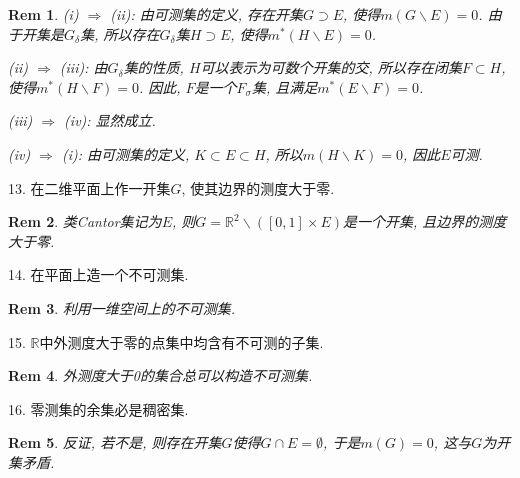 \documentclass[UTF8]{article}
\newtheorem*{remark}{Rem}
\begin{document}
    \begin{remark}
        (i) $\Rightarrow$ (ii): 由可测集的定义, 存在开集$G\supset E$, 使得$m(G\backslash E)=0$. 由于开集是$G_{\delta}$集, 所以存在$G_{\delta}$集$H\supset E$, 使得$m^{*}(H\backslash E)=0$.\par
        (ii) $\Rightarrow$ (iii): 由$G_{\delta}$集的性质, $H$可以表示为可数个开集的交, 所以存在闭集$F\subset H$, 使得$m^{*}(H\backslash F)=0$. 因此, $F$是一个$F_{\sigma}$集, 且满足$m^{*}(E\backslash F)=0$.\par
        (iii) $\Rightarrow$ (iv): 显然成立.\par
        (iv) $\Rightarrow$ (i): 由可测集的定义, $K\subset E\subset H$, 所以$m(H\backslash K)=0$, 因此$E$可测.\par
    \end{remark}
    13. 在二维平面上作一开集$G$, 使其边界的测度大于零.\par
    \begin{remark}
        类Cantor集记为$E$, 则$G=\mathbb{R}^2\backslash \left([0,1]\times E\right)$是一个开集, 且边界的测度大于零.\par
    \end{remark}
    14. 在平面上造一个不可测集.\par
    \begin{remark}
        利用一维空间上的不可测集.\par
    \end{remark}
    15. $\mathbb{R}$中外测度大于零的点集中均含有不可测的子集.\par
    \begin{remark}
        外测度大于0的集合总可以构造不可测集.\par
    \end{remark}
    16. 零测集的余集必是稠密集.\par
    \begin{remark}
        反证, 若不是, 则存在开集$G$使得$G\cap E=\emptyset$, 于是$m(G)=0$, 这与$G$为开集矛盾.\par
    \end{remark}
\end{document}
